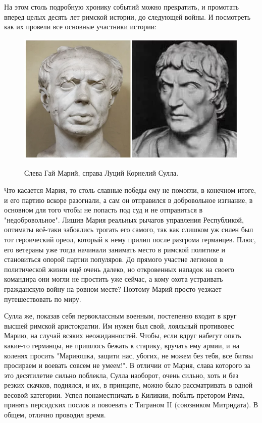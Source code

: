 На этом столь подробную хронику событий можно прекратить, и промотать вперед целых десять лет римской истории, до следующей войны. И посмотреть как их провели все основные участники истории:

\begin{figure}[h!tb]
	\centering\includegraphics[scale=0.6]{kimres/157475883618344045.png}
	\label{fig:kimr5} %
	\caption{Слева Гай Марий, справа Луций Корнелий Сулла. }
\end{figure}
Что касается Мария, то столь славные победы ему не помогли, в конечном итоге, и его партию вскоре разогнали, а сам он отправился в добровольное изгнание, в основном для того чтобы не попасть под суд и не отправиться в "недобровольное". Лишив Мария реальных рычагов управления Республикой, оптиматы всё-таки забоялись трогать его самого, так как слишком уж силен был тот героический ореол, который к нему прилип после разгрома германцев. Плюс, его ветераны уже тогда начинали занимать место в римской политике и становиться опорой партии популяров. До прямого участие легионов в политической жизни ещё очень далеко, но откровенных нападок на своего командира они могли не простить уже сейчас, а кому охота устраивать гражданскую войну на ровном месте? Поэтому Марий просто уезжает путешествовать по миру.


Сулла же, показав себя первоклассным военным, постепенно входит в круг высшей римской аристократии. Им нужен был свой, лояльный противовес Марию, на случай всяких неожиданностей. Чтобы, если вдруг набегут опять какие-то германцы, не пришлось бежать к старику, вручать ему армии, и на коленях просить "Мариюшка, защити нас, убогих, не можем без тебя, все битвы просираем и воевать совсем не умеем!". В отличии от Мария, слава которого за это десятилетие сильно поблекла, Сулла наоборот, очень сильно, хоть и без резких скачков, поднялся, и их, в принципе, можно было рассматривать в одной весовой категории. Успел понаместничать в Киликии, побыть претором Рима, принять персидских послов и повоевать с Тиграном II (союзником Митридата). В общем, отлично проводил время.


